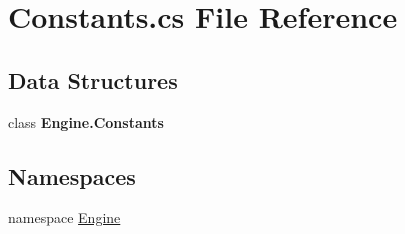 \hypertarget{a00005}{}\section{Constants.\+cs File Reference}
\label{a00005}
\subsection*{Data Structures}
\begin{DoxyCompactItemize}
\item 
class {\bfseries Engine.\+Constants}
\end{DoxyCompactItemize}
\subsection*{Namespaces}
\begin{DoxyCompactItemize}
\item 
namespace \hyperlink{a00240}{Engine}
\end{DoxyCompactItemize}
